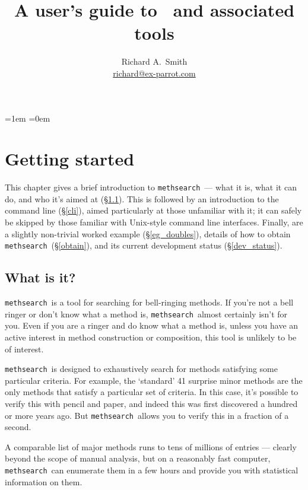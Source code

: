\documentclass[a4paper,11pt,oneside]{book}
\title{A user's guide to \methsearch\ and associated tools}
\author{Richard A.\ Smith\\\url{richard@ex-parrot.com}}
\def\methsearch{\texttt{meth\-search}}
\newcommand{\sref}[1]{\hyperref[#1]{\S\ref{#1}}}
\begin{document}
\frontmatter
\maketitle

\clearpage
{}
{}
\tableofcontents
\parskip=1em
\parindent=0em
\addtolength{\footnotesep}{4pt}

\mainmatter

\chapter{Getting started}

This chapter gives a brief introduction to \methsearch\ --- what it is,
what it can do, and who it's aimed at (\sref{what_is_it}).  
This is followed by an introduction to the command line (\sref{cli}),
aimed particularly at those unfamiliar with it; it can safely be
skipped by those familiar with Unix-style command line interfaces.  
Finally, are 
a slightly non-trivial worked example (\sref{eg_doubles}),
details of how to obtain \methsearch\ (\sref{obtain}), and its
current development status (\sref{dev_status}).


\section{What is it?}\label{what_is_it}

\methsearch\ is a tool for searching for bell-ringing methods.
If you're not a bell ringer or don't know what a method is, 
\methsearch\ almost certainly isn't for you.
Even if you are a ringer and do know what a method is, unless you have 
an active interest in method construction or composition, 
this tool is unlikely to be of interest.

\methsearch\ is designed to exhaustively search for methods satisfying
some particular criteria.  For example, the `standard' 41 surprise minor
methods are the only methods that satisfy a particular set of criteria.
In this case, it's possible to verify this with pencil and paper, and 
indeed this was first discovered a hundred or more years ago.  But 
\methsearch\ allows you to verify this in a fraction of a second.

A comparable list of major methods runs to tens of millions of entries ---
clearly beyond the scope of manual analysis, but on a reasonably 
fast computer, \methsearch\ can enumerate them in a few hours and provide 
you with statistical information on them.
\end{document}
